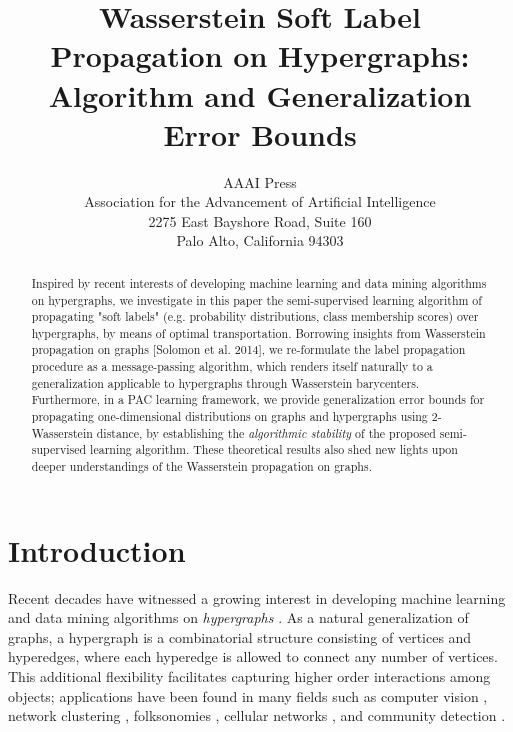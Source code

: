 \documentclass[letterpaper]{article} %
\begin{document}
\title{Wasserstein Soft Label Propagation on Hypergraphs: Algorithm and Generalization Error Bounds}
\author{AAAI Press\\
Association for the Advancement of Artificial Intelligence\\
2275 East Bayshore Road, Suite 160\\
Palo Alto, California 94303\\
}
\maketitle

\begin{abstract}
Inspired by recent interests of developing machine learning and data mining algorithms on hypergraphs, we investigate in this paper the semi-supervised learning algorithm of propagating "soft labels" (e.g. probability distributions, class membership scores) over hypergraphs, by means of optimal transportation. Borrowing insights from Wasserstein propagation on graphs [Solomon et al. 2014], we re-formulate the label propagation procedure as a message-passing algorithm, which renders itself naturally to a generalization applicable to hypergraphs through Wasserstein barycenters. 
Furthermore, in a PAC learning framework, we provide generalization error bounds for propagating one-dimensional distributions on graphs and hypergraphs using 2-Wasserstein distance, by establishing the \textit{algorithmic stability} of the proposed semi-supervised learning algorithm. These theoretical results also shed new lights upon deeper understandings of the Wasserstein propagation on graphs. 
\end{abstract}
	
\section{Introduction}
Recent decades have witnessed a growing interest in developing machine learning and data mining algorithms on \emph{hypergraphs} \cite{Hypergraph_Clustering,Hypergraph_Jost,Hypergraph_Game,Hypergraph_Kannan,Hypergraph_Olgica,Hypergraph_TV,HypergraphScalable}. As a natural generalization of graphs, a hypergraph is a combinatorial structure consisting of vertices and hyperedges, where each hyperedge is allowed to connect any number of vertices. This additional flexibility facilitates capturing higher order interactions among objects; applications have been found in many fields such as computer vision \cite{Govindu2005}, network clustering \cite{Hyper_Spatial}, folksonomies \cite{GZCN2009}, cellular networks \cite{KHT2009}, and community detection \cite{KBG2018}.
\end{document}
